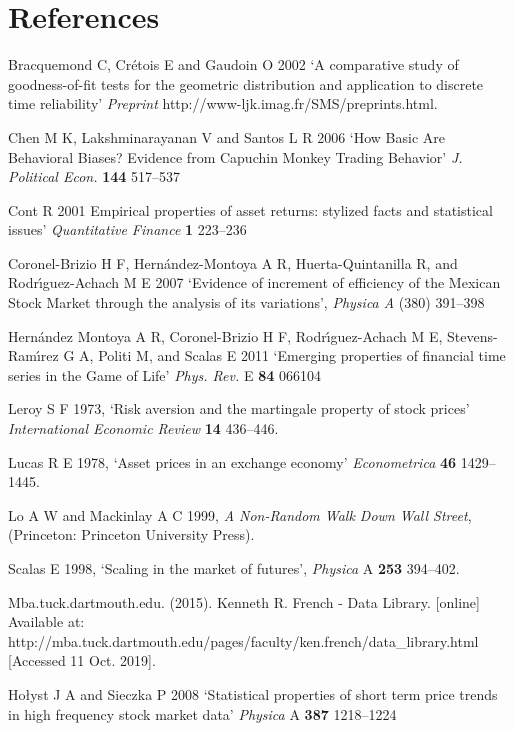 \documentclass[a4paper]{jpconf}
\begin{document}
\section*{References}
\begin{thebibliography}{15}

Bracquemond C, Cr\'etois E and Gaudoin O 2002 `A comparative study of goodness-of-fit tests for the geometric distribution and application to discrete time reliability' {\it Preprint} http://www-ljk.imag.fr/SMS/preprints.html.

Chen M K, Lakshminarayanan V and Santos L R 2006 `How Basic Are Behavioral Biases? Evidence from Capuchin Monkey Trading Behavior' {\it J. Political Econ.} {\bf 144} 517--537

Cont R 2001 Empirical properties of asset returns: stylized facts and statistical issues' {\it Quantitative Finance} {\bf 1} 223--236

Coronel-Brizio H F, Hern\'andez-Montoya A R, Huerta-Quintanilla R, and Rodr\'{\i}guez-Achach M E 2007 `Evidence of increment of efficiency of the Mexican Stock Market through the analysis of its variations', \textit{Physica A} (380) 391–398

Hern\'andez Montoya A R, Coronel-Brizio H F, Rodr\'{\i}guez-Achach M E, Stevens-Ram\'{\i}rez G A, Politi M, and Scalas E 2011 `Emerging properties of financial time series in the Game of Life' {\it Phys. Rev.} E {\bf 84} 066104

Leroy S F 1973, `Risk aversion and the martingale property of stock prices' {\it International Economic Review} {\bf 14} 436--446.

 Lucas R E 1978, `Asset prices in an exchange economy'  {\it Econometrica} {\bf 46} 1429--1445.

Lo A W and Mackinlay A C 1999, {\it A Non-Random Walk Down Wall Street}, (Princeton: Princeton University Press).

 Scalas E 1998, `Scaling in the market of futures', {\it Physica} A {\bf 253} 394--402.

Mba.tuck.dartmouth.edu. (2015). Kenneth R. French - Data Library. [online] Available at: http://mba.tuck.dartmouth.edu/pages/faculty/ken.french/data\_library.html [Accessed 11 Oct. 2019].

Ho\l{yst} J A and Sieczka P 2008 `Statistical properties of short term price trends in high frequency stock market data' {\it Physica} A {\bf 387} 1218--1224


\end{thebibliography}
\end{document}
